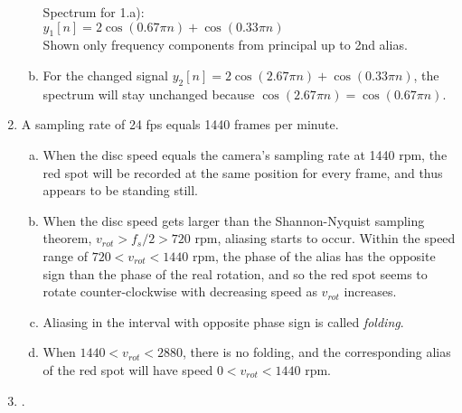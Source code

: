 \begin{enumerate}
\begin{enumerate}[a)]
\begin{marginfigure}
\begin{center}
		  \end{center}
		\caption{Spectrum for 1.a): \\ $y_1[n] = 2 \cos(0.67 \pi n) + \cos(0.33 \pi n)$ \\ Shown only frequency components from principal up to 2nd alias.}
		\label{fig:ex1}
		\end{marginfigure}
    
    \item For the changed signal $y_2[n] = 2 \cos(2.67 \pi n) + \cos(0.33 \pi n)$, the spectrum will stay unchanged because $\cos(2.67 \pi n) = \cos(0.67 \pi n)$.
  \end{enumerate}
  
  \item A sampling rate of 24 fps equals 1440 frames per minute.
  \begin{enumerate}[a)]
    \item When the disc speed equals the camera's sampling rate at 1440 rpm, the red spot will be recorded at the same position for every frame, and thus appears to be standing still.
    \item When the disc speed gets larger than the Shannon-Nyquist sampling theorem, $v_{rot} > f_s / 2 > 720$ rpm, aliasing starts to occur. Within the speed range of $720 < v_{rot} < 1440$ rpm, the phase of the alias has the opposite sign than the phase of the real rotation, and so the red spot seems to rotate counter-clockwise with decreasing speed as $v_{rot}$ increases.
    \item Aliasing in the interval with opposite phase sign is called \emph{folding}.
    \item When $1440 < v_{rot} < 2880$, there is no folding, and the corresponding alias of the red spot will have speed $0 < v_{rot} < 1440$ rpm.
  \end{enumerate}
  \item .
	
\end{enumerate}